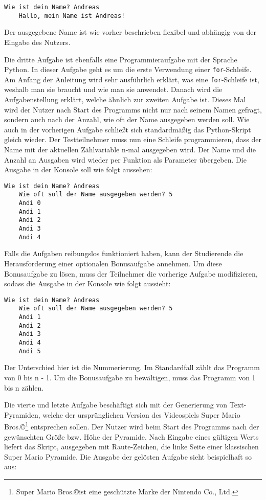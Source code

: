 \begin{lstlisting}[style=Bash]
    Wie ist dein Name? Andreas
    Hallo, mein Name ist Andreas!
\end{lstlisting}

Der ausgegebene Name ist wie vorher beschrieben flexibel und abhängig von der
Eingabe des Nutzers.

Die dritte Aufgabe ist ebenfalls eine Programmieraufgabe mit der Sprache Python.
In dieser Aufgabe geht es um die erste Verwendung einer \texttt{for}-Schleife.
Am Anfang der Anleitung wird sehr ausführlich erklärt, was eine
\texttt{for}-Schleife ist, weshalb man sie braucht und wie man sie anwendet.
Danach wird die Aufgabenstellung erklärt, welche ähnlich zur zweiten Aufgabe
ist. Dieses Mal wird der Nutzer nach Start des Programms nicht nur nach seinem
Namen gefragt, sondern auch nach der Anzahl, wie oft der Name ausgegeben werden
soll. Wie auch in der vorherigen Aufgabe schließt sich standardmäßig das
Python-Skript gleich wieder. Der Testteilnehmer muss nun eine Schleife
programmieren, dass der Name mit der aktuellen Zählvariable n-mal ausgegeben
wird. Der Name und die Anzahl an Ausgaben wird wieder per Funktion als Parameter
übergeben. Die Ausgabe in der Konsole soll wie folgt aussehen:

\begin{lstlisting}[style=Bash]
    Wie ist dein Name? Andreas
    Wie oft soll der Name ausgegeben werden? 5
    Andi 0
    Andi 1
    Andi 2
    Andi 3
    Andi 4
\end{lstlisting}

Falls die Aufgaben reibungslos funktioniert haben, kann der Studierende
die Herausforderung einer optionalen Bonusaufgabe annehmen. Um diese
Bonusaufgabe zu lösen, muss der Teilnehmer die vorherige Aufgabe modifizieren,
sodass die Ausgabe in der Konsole wie folgt aussieht:

\begin{lstlisting}[style=Bash]
    Wie ist dein Name? Andreas
    Wie oft soll der Name ausgegeben werden? 5
    Andi 1
    Andi 2
    Andi 3
    Andi 4
    Andi 5
\end{lstlisting}

Der Unterschied hier ist die Nummerierung. Im Standardfall zählt das Programm
von 0 bis n - 1. Um die Bonusaufgabe zu bewältigen, muss das Programm von 1 bis
n zählen.

Die vierte und letzte Aufgabe beschäftigt sich mit der Generierung von
Text-Pyramiden, welche der ursprünglichen Version des Videospiels Super Mario
Bros.\copyright\footnote{Super Mario Bros.\copyright ist eine geschützte Marke
der Nintendo Co., Ltd.} entsprechen sollen. Der Nutzer wird beim Start des
Programms nach der gewünschten Größe bzw. Höhe der Pyramide. Nach Eingabe eines
gültigen  Werts liefert das Skript, ausgegeben mit Raute-Zeichen, die linke
Seite einer klassischen Super Mario Pyramide. Die Ausgabe der gelösten Aufgabe
sieht beispielhaft so aus:

